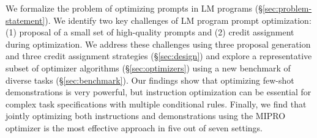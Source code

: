 We formalize the problem of optimizing prompts in LM programs (\S \ref{sec:problem-statement}).  We identify two key challenges of LM program prompt optimization: (1) proposal of a small set of high-quality prompts and (2) credit assignment during optimization.  We address these challenges using three proposal generation and three credit assignment strategies (\S \ref{sec:design}) and explore a representative subset of optimizer algorithms (\S \ref{sec:optimizers}) using a new benchmark of diverse tasks (\S \ref{sec:benchmark}). Our findings show that optimizing few-shot demonstrations is very powerful, but instruction optimization can be essential for complex task specifications with  multiple conditional rules. Finally, we find that jointly optimizing both instructions and demonstrations using the MIPRO optimizer is the most effective approach in five out of seven settings.



